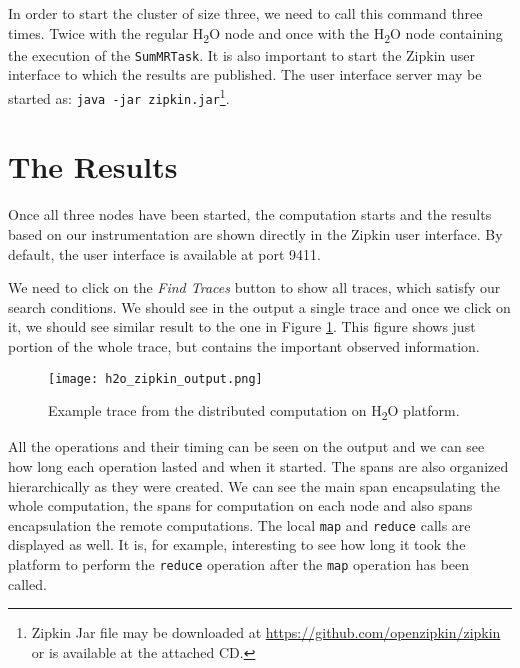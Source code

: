 In order to start the cluster of size three, we need to call this command three times. Twice with the regular H\textsubscript{2}O node and once with the H\textsubscript{2}O node containing the execution of the \texttt{SumMRTask}. It is also important to start the Zipkin user interface to which the results are published. The user interface server may be started as: \texttt{java -jar zipkin.jar}\footnote{Zipkin Jar file may be downloaded at \url{https://github.com/openzipkin/zipkin} or is available at the attached CD.}.
\section{The Results}
Once all three nodes have been started, the computation starts and the results based on our instrumentation are shown directly in the Zipkin user interface. By default, the user interface is available at port 9411.

We need to click on the \textit{Find Traces} button to show all traces, which satisfy our search conditions. We should see in the output a single trace and once we click on it, we should see similar result to the one in Figure \ref{h2o_zipkin_output}. This figure shows just portion of the whole trace, but contains the important observed information.
	\begin{figure}
		\centering
		\texttt{[image: h2o\_zipkin\_output.png]}
		\caption{Example trace from the distributed computation on H\textsubscript{2}O platform.}
		\label{h2o_zipkin_output}
	\end{figure}

All the operations and their timing can be seen on the output and we can see how long each operation lasted and when it started. The spans are also organized hierarchically as they were created. We can see the main span encapsulating the whole computation, the spans for computation on each node and also spans encapsulation the remote computations. The local \texttt{map} and \texttt{reduce} calls are displayed as well. It is, for example, interesting to see how long it took the platform to perform the \texttt{reduce} operation after the \texttt{map} operation has been called.